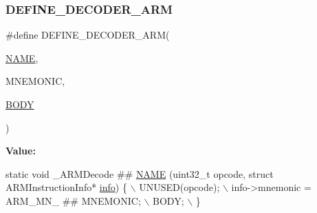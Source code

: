 \subsubsection{\texorpdfstring{D\+E\+F\+I\+N\+E\+\_\+\+D\+E\+C\+O\+D\+E\+R\+\_\+\+A\+RM}{DEFINE\_DECODER\_ARM}}
{\footnotesize\ttfamily \#define D\+E\+F\+I\+N\+E\+\_\+\+D\+E\+C\+O\+D\+E\+R\+\_\+\+A\+RM(\begin{DoxyParamCaption}\item[{}]{\mbox{\hyperlink{inflate_8h_a164ea0159d5f0b5f12a646f25f99eceaa67bc2ced260a8e43805d2480a785d312}{N\+A\+ME}},  }\item[{}]{M\+N\+E\+M\+O\+N\+IC,  }\item[{}]{\mbox{\hyperlink{gzlog_8c_aa6bdf6a6d9916c343e1e17774d84a156}{B\+O\+DY}} }\end{DoxyParamCaption})}

{\bfseries Value\+:}
\begin{DoxyCode}
\textcolor{keyword}{static} \textcolor{keywordtype}{void} \_ARMDecode ## \mbox{\hyperlink{inflate_8h_a164ea0159d5f0b5f12a646f25f99eceaa67bc2ced260a8e43805d2480a785d312}{NAME}} (uint32\_t opcode, \textcolor{keyword}{struct} ARMInstructionInfo* 
      \mbox{\hyperlink{libretro_8h_structretro__game__info}{info}}) \{ \(\backslash\)
        UNUSED(opcode); \(\backslash\)
        info->mnemonic = ARM\_MN\_ ## MNEMONIC; \(\backslash\)
        BODY; \(\backslash\)
    \}
\end{DoxyCode}
\mbox{\label{decoder-arm_8c_a5d6d802380fe63152e39d49de3ceb848}} 
